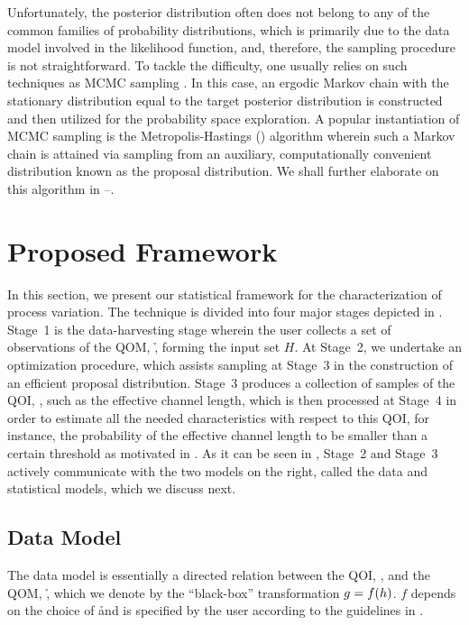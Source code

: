 Unfortunately, the posterior distribution often does not belong to any of the
common families of probability distributions, which is primarily due to the data
model involved in the likelihood function, and, therefore, the sampling
procedure is not straightforward. To tackle the difficulty, one usually relies
on such techniques as \ac{MCMC} sampling \cite{gelman2004}. In this case, an
ergodic Markov chain with the stationary distribution equal to the target
posterior distribution is constructed and then utilized for the probability
space exploration. A popular instantiation of \ac{MCMC} sampling is the
Metropolis-Hastings () algorithm wherein such a Markov chain is attained
via sampling from an auxiliary, computationally convenient distribution known as
the proposal distribution. We shall further elaborate on this algorithm in
--.

\section{Proposed Framework}

In this section, we present our statistical framework for the characterization
of process variation. The technique is divided into four major stages depicted
in . Stage~1 is the data-harvesting stage wherein the user
collects a set of observations of the \ac{QOM}, \h, forming the input set $H$.
At Stage~2, we undertake an optimization procedure, which assists 
sampling at Stage~3 in the construction of an efficient proposal distribution.
Stage~3 produces a collection of samples of the \ac{QOI}, \g, such as the
effective channel length, which is then processed at Stage~4 in order to
estimate all the needed characteristics with respect to this \ac{QOI}, for
instance, the probability of the effective channel length to be smaller than a
certain threshold as motivated in . As it can be seen in
, Stage~2 and Stage~3 actively communicate with the two models
on the right, called the data and statistical models, which we discuss next.

\subsection{Data Model}

The data model is essentially a directed relation between the \ac{QOI}, \g, and
the \ac{QOM}, \h, which we denote by the ``black-box'' transformation $g =
f(h)$. $f$ depends on the choice of \h and is specified by the user according
to the guidelines in .

